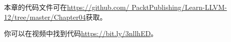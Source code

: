 本章的代码文件可在\url{https://github.com/
PacktPublishing/Learn-LLVM-12/tree/master/Chapter04}获取。\par

你可以在视频中找到代码\url{https://bit.ly/3nllhED}。\par